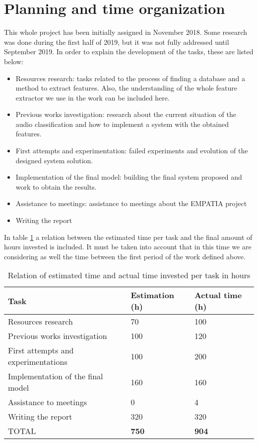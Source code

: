 
\section{Planning and time organization}

	This whole project has been initially assigned in November 2018. Some research was done during the first half of 2019, but it was not fully addressed until September 2019. In order to explain the development of the tasks, these are listed below:
	
	\begin{itemize}
		\item Resources research: tasks related to the process of finding a database and a method to extract features. Also, the understanding of the whole feature extractor we use in the work can be included here.
		\item Previous works investigation: research about the current situation of the audio classification and how to implement a system with the obtained features.
		\item First attempts and experimentation: failed experiments and evolution of the designed system solution.
		\item Implementation of the final model: building the final system proposed and work to obtain the results.
		\item Assistance to meetings: assistance to meetings about the EMPATIA project
		\item Writing the report
	\end{itemize}

	In table \ref{table:14} a relation between the estimated time per task and the final amount of hours invested is included. It must be taken into account that in this time we are considering as well the time between the first period of the work defined above.
	
	\begin{table}[H]
		\begin{center}
			\begin{tabular}{|| m{10em} | m{7em} | m{7em} ||}
				\hline
				\textbf{Task} & \textbf{Estimation (h)} & \textbf{Actual time (h)} \\
				\hline\hline
				Resources research & 70 & 100 \\
				\hline
				Previous works investigation & 100 & 120 \\
				\hline
				First attempts and experimentations & 100 & 200 \\
				\hline
				Implementation of the final model & 160 & 160 \\
				\hline
				Assistance to meetings & 0 & 4 \\
				\hline
				Writing the report & 320 & 320 \\
				\hline
				TOTAL & \textbf{750} & \textbf{904} \\
				\hline
			\end{tabular}
		\end{center}
		\caption{Relation of estimated time and actual time invested  per task in hours}
		\label{table:14}
	\end{table}


